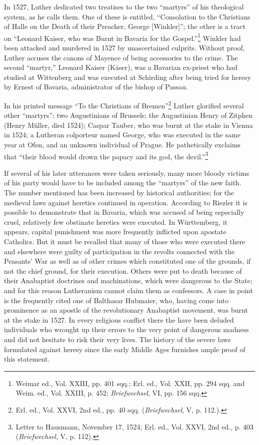 In 1527, Luther dedicated two treatises to the two “martyrs” of his
theological system, as he calls them. One of these is entitled, “Consolation
to the Christians of Halle on the Death of their Preacher,
George [Winkler]”; the other is a tract on “Leonard Kaiser, who was
Burnt in Bavaria for the Gospel.”\footnote{Weimar ed., Vol. XXIII, pp. 401 sqq.; Erl. ed., Vol. XXII, pp. 294 sqq. and Weim. ed.,
Vol. XXIII, p. 452; \textit{Briefwechsel}, VI, pp. 156 sqq.}
 Winkler had been attacked and
murdered in 1527 by unascertained culprits. Without proof, Luther
accuses the canons of Mayence of being accessories to the crime. The
second “martyr,” Leonard Kaiser (Käser), was a Bavarian ex-priest
who had studied at Wittenberg and was executed at Schirding after
being tried for heresy by Ernest of Bavaria, administrator of the bishop
of Passau.

In his printed message “To the Christians of Bremen”\footnote{Erl. ed., Vol. XXVI, 2nd ed., pp. 40 sqq. (\textit{Briefwechsel}, V, p. 112.).}
 Luther
glorified several other “martyrs”: two Augustinians of Brussels; the
Augustinian Henry of Zitphen (Henry Müller, died 1524); Caspar
Tauber, who was burnt at the stake in Vienna in 1524; a Lutheran
colporteur named George, who was executed in the same year at Ofen,
and an unknown individual of Prague. He pathetically exclaims that
“their blood would drown the papacy and its god, the devil.”\footnote
{Letter to Hausmann, November 17, 1524; Erl. ed., Vol. XXVI, 2nd ed., p. 403
(\textit{Briefwechsel}, V, p. 112).}

If several of his later utterances were taken seriously, many more
bloody victims of his party would have to be included among the
“martyrs” of the new faith. The number mentioned has been increased
by historical authorities; for the medieval laws against heretics continued
in operation. According to Riezler it is possible to demonstrate
that in Bavaria, which was accused of being especially cruel, relatively
few obstinate heretics were executed. In Württemberg, it appears,
capital punishment was more frequently inflicted upon apostate Catholics.
But it must be recalled that many of those who were executed
there and elsewhere were guilty of participation in the revolts connected
with the Peasants’ War as well as of other crimes which constituted one
of the grounds, if not the chief ground, for their execution. Others were
put to death because of their Anabaptist doctrines
and machinations, which were dangerous to the State; and for this
reason Lutheranism cannot claim them as confessors. A case in point is
the frequently cited one of Balthasar Hubmaier, who, having come
into prominence as an apostle of the revolutionary Anabaptist movement,
was burnt at the stake in 1527. In every religious conflict there the
have been deluded individuals who wrought up their errors to the very
point of dangerous madness and did not hesitate to risk their very
lives. The history of the severe laws formulated against heresy since
the early Middle Ages furnishes ample proof of this statement.

